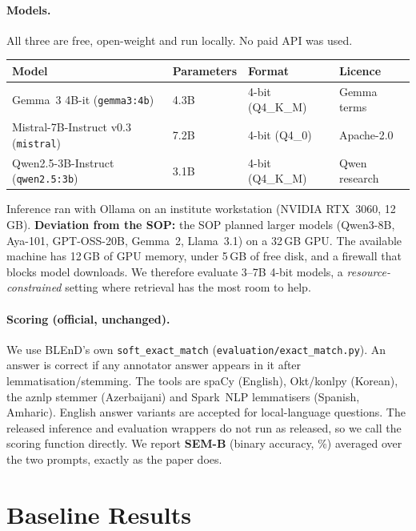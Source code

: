 \documentclass[11pt]{article}
\begin{document}
\paragraph{Models.} All three are free, open-weight and run locally. No paid API was used.
\begin{center}
\begin{tabular}{llll}
\toprule
Model & Parameters & Format & Licence \\
\midrule
Gemma~3 4B-it (\texttt{gemma3:4b})          & 4.3B & 4-bit (Q4\_K\_M) & Gemma terms \\
Mistral-7B-Instruct v0.3 (\texttt{mistral}) & 7.2B & 4-bit (Q4\_0)    & Apache-2.0 \\
Qwen2.5-3B-Instruct (\texttt{qwen2.5:3b})   & 3.1B & 4-bit (Q4\_K\_M) & Qwen research \\
\bottomrule
\end{tabular}
\end{center}
Inference ran with Ollama on an institute workstation (NVIDIA RTX~3060, 12\,GB).
\textbf{Deviation from the SOP:} the SOP planned larger models (Qwen3-8B, Aya-101, GPT-OSS-20B,
Gemma~2, Llama~3.1) on a 32\,GB GPU. The available machine has 12\,GB of GPU memory, under 5\,GB of
free disk, and a firewall that blocks model downloads. We therefore evaluate 3--7B 4-bit models,
a \emph{resource-constrained} setting where retrieval has the most room to help.

\paragraph{Scoring (official, unchanged).} We use BLEnD's own \texttt{soft\_exact\_match}
(\texttt{evaluation/exact\_match.py}). An answer is correct if any annotator answer appears in it after
lemmatisation/stemming. The tools are spaCy (English), Okt/konlpy (Korean), the aznlp stemmer
(Azerbaijani) and Spark~NLP lemmatisers (Spanish, Amharic). English answer variants are accepted for
local-language questions. The released inference and evaluation wrappers do not run as released, so
we call the scoring function directly. We report \textbf{SEM-B} (binary accuracy, \%) averaged over
the two prompts, exactly as the paper does.

\section{Baseline Results}
\end{document}
